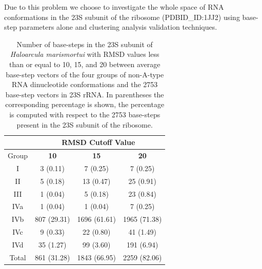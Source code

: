 Due to this  problem we choose to investigate the  whole space of RNA
conformations  in the  23S  subunit of  the ribosome  (PDBID\_ID:1JJ2)
using  base-step parameters alone  and clustering  analysis validation
techniques.

\begin{table}[htbp]
\begin{center}
{\footnotesize
\begin{tabular}{c|c|c|c}
\hline
 & \multicolumn{3}{c}{\bf{RMSD Cutoff Value}}\\ \hline
Group   & \bf{10} & \bf{15} & \bf{20}\\ \hline
I & 3 (0.11) & 7 (0.25) & 7 (0.25)\\ \hline
II & 5 (0.18) & 13 (0.47) & 25 (0.91)\\ \hline
III & 1 (0.04) & 5 (0.18) & 23 (0.84)\\ \hline
IVa & 1 (0.04) & 1 (0.04) & 7 (0.25)\\ \hline
IVb & 807 (29.31) & 1696 (61.61) & 1965 (71.38)\\ \hline
IVc & 9 (0.33) & 22 (0.80) & 41 (1.49)\\ \hline
IVd & 35 (1.27) & 99 (3.60) & 191 (6.94)\\ \hline \hline
Total & 861 (31.28) & 1843 (66.95) & 2259 (82.06)\\ \hline
\end{tabular}
}
\caption{Number of base-steps in the 23S subunit of \textit{Haloarcula
    marismortui} with RMSD values less than or equal to 10, 15, and 20
  between average base-step vectors of the four groups of non-A-type RNA
  dinucleotide  conformations and  the 2753  base-step vectors  in 23S
  rRNA.  In parentheses  the  corresponding percentage  is shown,  the
  percentage is computed with respect to the 2753
  base-steps present in the 23S subunit of the ribosome.}
\label{tab:nonA}
\end{center}
\end{table}

